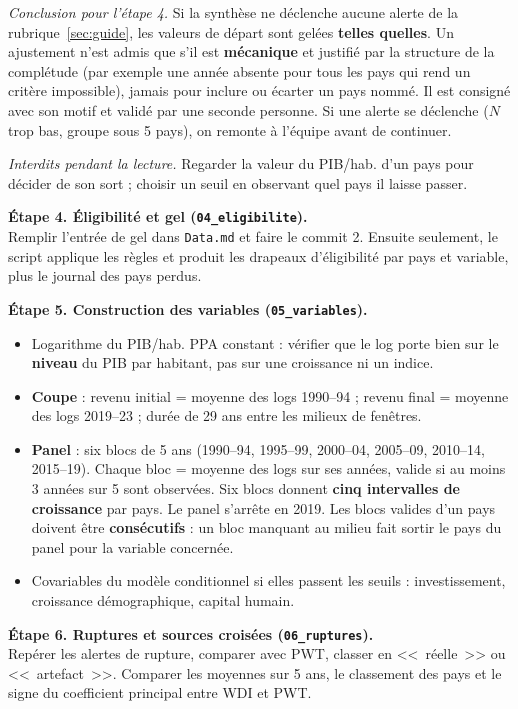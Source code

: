 \documentclass[21pt,a4paper]{article}
\begin{document}
	\textit{Conclusion pour l'étape 4.} Si la synthèse ne déclenche aucune alerte de la rubrique~\ref{sec:guide}, les valeurs de départ sont gelées \textbf{telles quelles}. Un ajustement n'est admis que s'il est \textbf{mécanique} et justifié par la structure de la complétude (par exemple une année absente pour tous les pays qui rend un critère impossible), jamais pour inclure ou écarter un pays nommé. Il est consigné avec son motif et validé par une seconde personne. Si une alerte se déclenche ($N$ trop bas, groupe sous 5 pays), on remonte à l'équipe avant de continuer.
	
	\textit{Interdits pendant la lecture.} Regarder la valeur du PIB/hab. d'un pays pour décider de son sort ; choisir un seuil en observant quel pays il laisse passer.
	
	\textbf{Étape 4. Éligibilité et gel (\texttt{04\_eligibilite}).}\\
	Remplir l'entrée de gel dans \texttt{Data.md} et faire le commit 2. Ensuite seulement, le script applique les règles et produit les drapeaux d'éligibilité par pays et variable, plus le journal des pays perdus.
	
	\textbf{Étape 5. Construction des variables (\texttt{05\_variables}).}
	\begin{itemize}
		\item Logarithme du PIB/hab. PPA constant : vérifier que le log porte bien sur le \textbf{niveau} du PIB par habitant, pas sur une croissance ni un indice.
		\item \textbf{Coupe} : revenu initial = moyenne des logs 1990--94 ; revenu final = moyenne des logs 2019--23 ; durée de 29 ans entre les milieux de fenêtres.
		\item \textbf{Panel} : six blocs de 5 ans (1990--94, 1995--99, 2000--04, 2005--09, 2010--14, 2015--19). Chaque bloc = moyenne des logs sur ses années, valide si au moins 3 années sur 5 sont observées. Six blocs donnent \textbf{cinq intervalles de croissance} par pays. Le panel s'arrête en 2019. Les blocs valides d'un pays doivent être \textbf{consécutifs} : un bloc manquant au milieu fait sortir le pays du panel pour la variable concernée.
		\item Covariables du modèle conditionnel si elles passent les seuils : investissement, croissance démographique, capital humain.
	\end{itemize}
	
	\textbf{Étape 6. Ruptures et sources croisées (\texttt{06\_ruptures}).}\\
	Repérer les alertes de rupture, comparer avec PWT, classer en <<~réelle~>> ou <<~artefact~>>. Comparer les moyennes sur 5 ans, le classement des pays et le signe du coefficient principal entre WDI et PWT.
	
\end{document}
